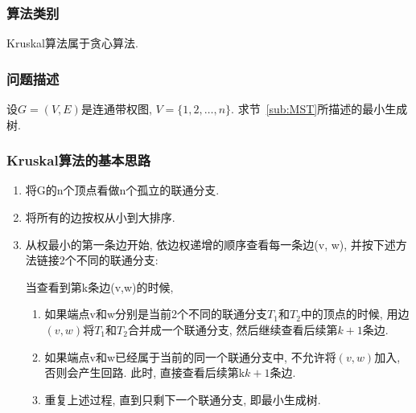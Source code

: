 \subsubsection{算法类别}
Kruskal算法属于贪心算法.

\subsubsection{问题描述}
设$G=(V,E)$是连通带权图, $V=\{1,2,\dots,n\}$. 求节~\ref{sub:MST}所描述的最小生成树.

\subsubsection{Kruskal算法的基本思路}
\begin{enumerate}
	\item 将G的n个顶点看做n个孤立的联通分支.
	\item 将所有的边按权从小到大排序.
	\item 从权最小的第一条边开始, 依边权递增的顺序查看每一条边(v, w),
	      并按下述方法链接2个不同的联通分支:\par
	      当查看到第k条边(v,w)的时候,
	      \begin{enumerate}
		      \item
		            如果端点v和w分别是当前2个不同的联通分支$T_1$和$T_2$中的顶点的时候,
		            用边$(v,w)$将$T_1$和$T_2$合并成一个联通分支,
		            然后继续查看后续第$k+1$条边.
		      \item 如果端点v和w已经属于当前的同一个联通分支中, 不允许将$(v,w)$加入,
		            否则会产生回路. 此时, 直接查看后续第k$k+1$条边.
		      \item 重复上述过程, 直到只剩下一个联通分支, 即最小生成树.
	      \end{enumerate}
\end{enumerate}

